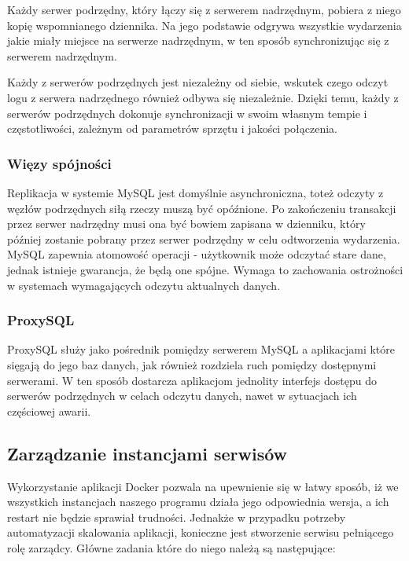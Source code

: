 \documentclass[11pt,a4paper,twoside]{article}
\begin{document}
Każdy serwer podrzędny, który łączy się z serwerem nadrzędnym, pobiera z niego kopię wspomnianego dziennika. Na jego podstawie odgrywa wszystkie wydarzenia jakie miały miejsce na  serwerze nadrzędnym, w ten sposób synchronizując się z serwerem nadrzędnym.

Każdy z serwerów podrzędnych jest niezależny od siebie, wskutek czego odczyt logu z serwera nadrzędnego również odbywa się niezależnie. Dzięki temu, każdy z serwerów podrzędnych dokonuje synchronizacji w swoim własnym tempie i częstotliwości, zależnym od parametrów sprzętu i jakości połączenia.

\subsubsection{Więzy spójności}
Replikacja w systemie MySQL jest domyślnie asynchroniczna, toteż odczyty z węzłów podrzędnych siłą rzeczy muszą być opóźnione. Po zakończeniu transakcji przez serwer nadrzędny musi ona być bowiem zapisana w dzienniku, który później zostanie pobrany przez serwer podrzędny w celu odtworzenia wydarzenia. MySQL zapewnia atomowość operacji - użytkownik może odczytać stare dane, jednak istnieje gwarancja, że będą one spójne. Wymaga to zachowania ostrożności w systemach wymagających odczytu aktualnych danych.

\subsubsection{ProxySQL}
ProxySQL służy jako pośrednik pomiędzy serwerem MySQL a aplikacjami które sięgają do jego baz danych, jak również rozdziela ruch pomiędzy dostępnymi serwerami. W ten sposób dostarcza aplikacjom jednolity interfejs dostępu do serwerów podrzędnych w celach odczytu danych, nawet w sytuacjach ich częściowej awarii.

\subsection{Zarządzanie instancjami serwisów}
Wykorzystanie aplikacji Docker pozwala na upewnienie się w łatwy sposób, iż we wszystkich instancjach naszego programu działa jego odpowiednia wersja, a ich restart nie będzie sprawiał trudności. Jednakże w przypadku potrzeby automatyzacji skalowania aplikacji, konieczne jest stworzenie serwisu pełniącego rolę zarządcy. Główne zadania które do niego należą są następujące:
\end{document}
